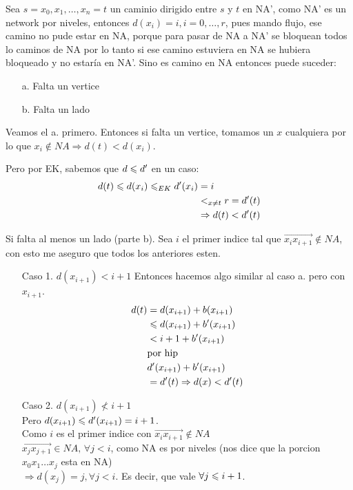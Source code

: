 \documentclass[12pt,a4paper]{article}
\begin{document}
Sea $s=x_{0},x_{1},\ldots,x_{n}=t$ un caminio dirigido entre $s$ y $t$ en NA', como 
NA' es un network por niveles, entonces $d(x_{i}) = i, i=0,\ldots,r$, pues mando flujo,
ese camino no pude estar en NA, porque para pasar de NA a NA' se bloquean todos lo 
caminos de NA por lo tanto si ese camino estuviera en NA se hubiera bloqueado y no 
estaría en NA'. Sino es camino en NA entonces puede suceder:
\begin{itemize}
    \item [a.] Falta un vertice 
    \item [b.] Falta un lado
\end{itemize}

Veamos el a. primero. Entonces si falta un vertice, tomamos un $x$ cualquiera por 
lo que $x_{i} \notin NA \Rightarrow d(t) < d(x_{i})$.
\medskip

Pero por EK, sabemos que $d \leqslant d'$ en un caso:
\begin{align*}
    d(t) \leqslant d(x_{i}) \leqslant_{EK} d'(x_{i}) &= i\\
    &<_{x\neq t} r = d'(t)\\
    &\Rightarrow d(t) < d'(t)
\end{align*}

Si falta al menos un lado (parte b). Sea $i$ el primer indice tal que $\overrightarrow{x_{i}x_{i+1}} \notin NA$, con 
esto me aseguro que todos los anteriores esten.
\begin{itemize}
    \item [Caso 1.] $d(x_{i+1}) < i+1$
        Entonces hacemos algo similar al caso a. pero con $x_{i+1}$.
        \begin{align*}
            d(t) &= d(x_{i+1}) + b(x_{i+1})\\
            &\leqslant d(x_{i+1}) + b'(x_{i+1})\\
            &< i + 1 + b'(x_{i+1})\\
            &\text{por hip}\\
            &d'(x_{i+1}) + b'(x_{i+1})\\
            &=d'(t) \Rightarrow d(x) < d'(t)\\
        \end{align*}
    \item [Caso 2.] $d(x_{i+1}) \nless i+1$\\
        Pero $d(x_{i+1}) \leqslant d'(x_{i+1}) = i+1$. \\
        Como $i$ es el primer indice con $\overrightarrow{x_{i}x_{i+1}} \notin NA$ \\
        $\overrightarrow{x_{j}x_{j+1}} \in NA,\, \forall j<i$, como NA es por niveles 
        (nos dice que la porcion $x_{0}x_{1} \ldots x_{j}$ esta en NA)\\
        $\Rightarrow d(x_{j}) = j, \forall j<i$. Es decir, que vale $\forall j \leqslant i+1$.
\end{itemize}
\end{document}
